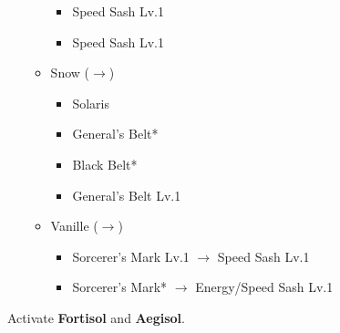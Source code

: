 \begin{menu}
\begin{itemize}
\begin{itemize}
\begin{itemize}
					\item Speed Sash Lv.1
					\item Speed Sash Lv.1
				\end{itemize}
			\item Snow ($\rightarrow$)
				\begin{itemize}
					\item Solaris
					\item General's Belt*
					\item Black Belt*
					\item General's Belt Lv.1
				\end{itemize}
			\item Vanille ($\rightarrow$)
				\begin{itemize}
					\item Sorcerer's Mark Lv.1 $\rightarrow$ Speed Sash Lv.1
					\item Sorcerer's Mark* $\rightarrow$ Energy/Speed Sash Lv.1
				\end{itemize}
		\end{itemize}
	\end{itemize}
\end{menu}

\renewcommand{\first}{[1] Cerberus (\com/\com/\com)}
\renewcommand{\second}{[2] Solidarity (\com/\sen/\med)}
\renewcommand{\third}{[3] Delta Attack (\com/\sen/\rav)}
\renewcommand{\fourth}{[4] Protection (\syn/\sen/\med)}
\renewcommand{\fifth}{[5] Mystic Tower (\rav/\sen/\rav)}
\renewcommand{\sixth}{[6] Tortoise (\sen/\sen/\sen)}

Activate \textbf{Fortisol} and \textbf{Aegisol}.
\vfill

